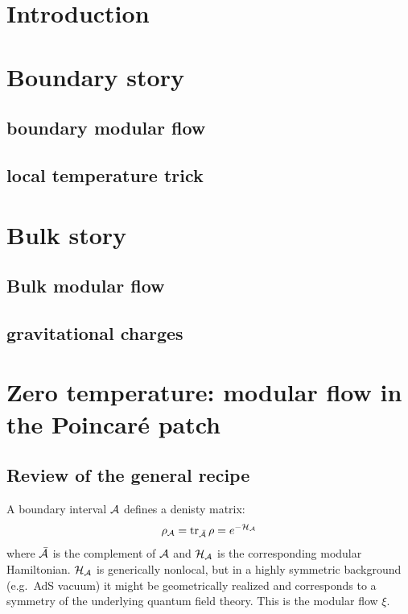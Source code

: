 \documentclass[11pt,a4paper]{article}
\begin{document}
	
\pagebreak

\section{Introduction}

\section{Boundary story }
\subsection{boundary modular flow}
\subsection{local temperature trick}
\subsection{}


\section{Bulk story}
\subsection{Bulk modular flow}
\subsection{gravitational charges}






\section{Zero temperature: modular flow in the Poincar\'e patch}
	
\subsection{Review of the general recipe}
	A boundary interval $\mathcal{A}$ defines a denisty matrix:
	\begin{equation}
		\rho_{\mathcal{A}}
		= \operatorname{tr}_{\bar{\mathcal{A}}} \rho
		= e^{-\mathcal{H}_{\mathcal{A}}}
	\end{equation}
	where $\bar{\mathcal{A}}$ is the complement of $\mathcal{A}$ and $\mathcal{H}_{\mathcal{A}}$ is the corresponding modular Hamiltonian. $\mathcal{H}_{\mathcal{A}}$ is generically nonlocal, but in a highly symmetric background (e.g.~AdS vacuum) it might be geometrically realized and corresponds to a symmetry of the underlying quantum field theory. This is the modular flow $\xi$. 
	
\end{document}
